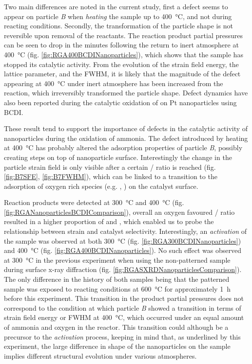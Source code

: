 Two main differences are noted in the current study, first a defect seems to appear on particle \textit{B} when \textit{heating} the sample up to \qty{400}{\degreeCelsius}, and not during reacting conditions.
Secondly, the transformation of the particle shape is not reversible upon removal of the reactants.
The reaction product partial pressures can be seen to drop in the minutes following the return to inert atmosphere at \qty{400}{\degreeCelsius} (fig. \ref{fig:RGA400BCDINanoparticles}), which shows that the sample has stopped its catalytic activity.
From the evolution of the strain field energy, the lattice parameter, and the FWHM, it is likely that the magnitude of the defect appearing at \qty{400}{\degreeCelsius} under inert atmosphere has been increased from the reaction, which irreversibly transformed the particle shape.
Defect dynamics have also been reported during the catalytic oxidation of  on Pt nanoparticles \parencite{Carnis2021b} using BCDI.

These result tend to support the importance of defects in the catalytic activity of nanoparticles during the oxidation of ammonia.
The defect introduced by heating at \qty{400}{\degreeCelsius} has probably altered the adsorption properties of particle \textit{B}, possibly creating steps on top of nanoparticle surface.
Interestingly the change in the particle strain field is only visible after a certain / ratio is reached (fig. \ref{fig:B7SFE}, \ref{fig:B7FWHM}), which can be linked to a transition to the adsorption of oxygen rich species (e.g. , ) on the catalyst surface.

Reaction products were detected at \qty{300}{\degreeCelsius} and \qty{400}{\degreeCelsius} (fig. \ref{fig:RGANanoparticlesBCDIComparison}), overall an oxygen favoured / ratio resulted in a higher proportion of  and , which enabled us to probe the relationship between strain and catalyst selectivity.
Interestingly, an \textit{activation} of the sample was observed at both \qty{300}{\degreeCelsius} (fig. \ref{fig:RGA300BCDINanoparticles}) and \qty{400}{\degreeCelsius} (fig. \ref{fig:RGA400BCDINanoparticles}).
No such effect was observed at \qty{300}{\degreeCelsius} in the previous experiment when using the non-patterned sample during surface x-ray diffraction (fig. \ref{fig:RGASXRDNanoparticlesComparison}).
The only difference in the history of both samples being that the patterned sample was exposed to reacting conditions at \qty{600}{\degreeCelsius} for approximately \qty{1}{\hour} before this experiment.
This transition in the product partial pressures does not correspond to the condition at which particle \textit{B} showed a transition in terms of strain field energy or FWHM at \qty{400}{\degreeCelsius}, which occurred under an equal amount of ammonia and oxygen in the reactor.
This transition could although be a precursor to the \textit{activation} process, keeping in mind that, as underlined by this experiment, the large difference in shape of the nanoparticles on the sample implies different structural evolution under various atmospheres.

